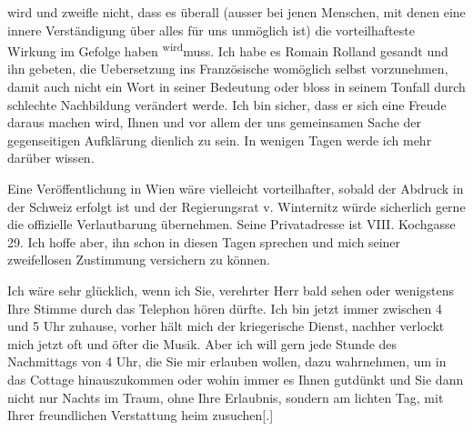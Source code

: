                wird und zweifle nicht, dass es überall (ausser bei jenen Menschen, mit denen eine
               innere Verständigung über alles für uns unmöglich ist) die vorteilhafteste Wirkung im
               Gefolge haben \substVorne{}\textsuperscript{wird}\substDazwischen{}muss\substHinten{}. Ich habe es Romain Rolland gesandt
               und ihn gebeten, die Uebersetzung ins Französische womöglich selbst vorzunehmen, damit auch nicht ein Wort in
               seiner Bedeutung oder bloss \introOben{}in\introOben{} seinem Tonfall durch
               schlechte Nachbildung verändert werde. Ich bin sicher, dass er sich eine Freude
               daraus machen wird\introOben{},\introOben{} Ihnen und vor allem der uns gemeinsamen
               Sache der gegenseitigen Aufklärung dienlich zu sein. In wenigen Tagen werde ich mehr
               darüber wissen.\pend
           
\pstart
           Eine Veröffentlichung in Wien wäre vielleicht
               vorteilhafter, sobald der Abdruck in der Schweiz erfolgt ist und
               der Regierungsrat v. Winternitz würde
               sicherlich gerne die offizielle Verlautbarung übernehmen. Seine Privatadresse ist VIII. Kochgasse 29. Ich hoffe aber, ihn schon
               in diesen Tagen sprechen und mich seiner zweifellosen Zustimmung versichern zu
               können. \pend
           
\pstart
           Ich wäre sehr glücklich, wenn ich Sie, verehrter Herr \label{K_L03683-2v}\label{K_L03683-2} bald sehen oder wenigstens Ihre Stimme durch das
               Telephon hören dürfte. Ich bin jetzt {\pb}immer zwischen 4 und 5 Uhr zuhause, vorher hält mich der kriegerische Dienst,
               nachher verlockt mich jetzt oft und öfter die Musik. Aber ich will gern jede Stunde
               des Nachmittags von 4 Uhr, die Sie mir erlauben wollen, dazu wahrnehmen, um in das
                  Cottage hinauszukommen oder wohin immer es
               Ihnen gutdünkt und Sie dann nicht nur Nachts im
               Traum, ohne Ihre Erlaubnis, sondern am lichten Tag, mit Ihrer freundlichen
               Verstattung heim \introOben{}zu\introOben{}suchen{[}.{]}\pend
           
